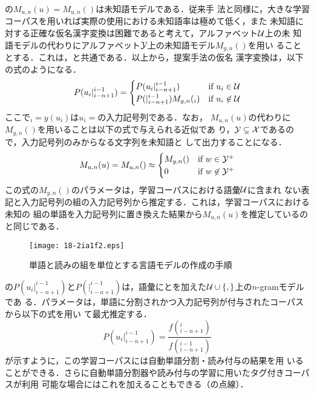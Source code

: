 \documentclass[japanese]{jnlp_JS2.0}
\def\BT{}
\def\Bdma#1{}
\def\figref#1{}
\def\equref#1{}
\def\UU{}
\def\unit{}
\def\unitA1#1{}
\begin{document}
\equref{eqnarray:KKConv2}の$M_{u,n}(u) = M_{u,n}(\unit)$は未知語モデルである．従来手
法と同様に，大きな学習コーパスを用いれば実際の使用における未知語率は極めて低く，また
未知語に対する正確な仮名漢字変換は困難であると考えて，アルファベット${\cal U}$上の未
知語モデルの代わりにアルファベット${\cal Y}$上の未知語モデル$M_{y,n}(\Bdma{y})$を用い
ることとする．これは，\equref{eqnarray:KKConv1}と共通である．以上から，提案手法の仮名
漢字変換は，以下の式のようになる．
\begin{equation}
  \label{eqnarray:KKConv3}
  P(u_{i}|\Bdma{u}_{i-n+1}^{i-1})
   = \begin{cases}
     P(u_{i}|\Bdma{u}_{i-n+1}^{i-1}) & \text{if} \ u_{i} \in {\cal U} \\
     P(\UU|\Bdma{u}_{i-n+1}^{i-1})M_{y,n}(\Bdma{y}_{i})
                                     & \text{if} \ u_{i} \not \in {\cal U}
     \end{cases}
\end{equation}
ここで$\Bdma{y}_{i} = y(u_{i})$は$u_{i} = \unitA1{i}$の入力記号列である．なお，
$M_{u, n}(u)$の代わりに$M_{y,n}(\Bdma{y})$を用いることは以下の式で与えられる近似であ
り，${\cal Y} \subsetneq {\cal X}$であるので，入力記号列のみからなる文字列を未知語と
して出力することになる．
\[
  M_{u,n}(u) = M_{u,n}(\unit) \approx
  \begin{cases}
    M_{y,n}(\Bdma{y}) & \text{if} \ w \in {\cal Y}^{+} \\
    0                 & \text{if} \ w \not \in {\cal Y}^{+}
  \end{cases}
\]
この式の$M_{y,n}(\Bdma{y})$のパラメータは，学習コーパスにおける語彙${\cal U}$に含まれ
ない表記と入力記号列の組の入力記号列から推定する．これは，学習コーパスにおける未知の
組の単語を入力記号列に置き換えた結果から$M_{u,n}(u)$を推定しているのと同じである．

\begin{figure}[t]
\begin{center}
\texttt{[image: 18-2ia1f2.eps]}
\end{center}
\caption{単語と読みの組を単位とする言語モデルの作成の手順}
\label{figure:LMB}
\end{figure}

\equref{eqnarray:KKConv3}の$P(u_{i}|\Bdma{u}_{i-n+1}^{i-1})$と$P(\UU|\Bdma{u}_{i-n+1}
^{i-1})$は，語彙に\BT と\UU を加えた${\cal U}\cup\{\BT,\UU\}$上の$n$-gramモデルであ
る．パラメータは，単語に分割されかつ入力記号列が付与されたコーパスから以下の式を用い
て最尤推定する．
\begin{equation}
  \label{equation:UM}
  P(u_{i}| \Bdma{u}_{i-n+1}^{i-1})
  = \frac{f(\Bdma{u}_{i-n+1}^{i})}{f(\Bdma{u}_{i-n+1}^{i-1})}
\end{equation}
\figref{figure:LMB}が示すように，この学習コーパスには自動単語分割・読み付与の結果を用
いることができる．さらに自動単語分割器や読み付与の学習に用いたタグ付きコーパスが利用
可能な場合にはこれを加えることもできる（\figref{figure:LMB}の点線）．
\end{document}
